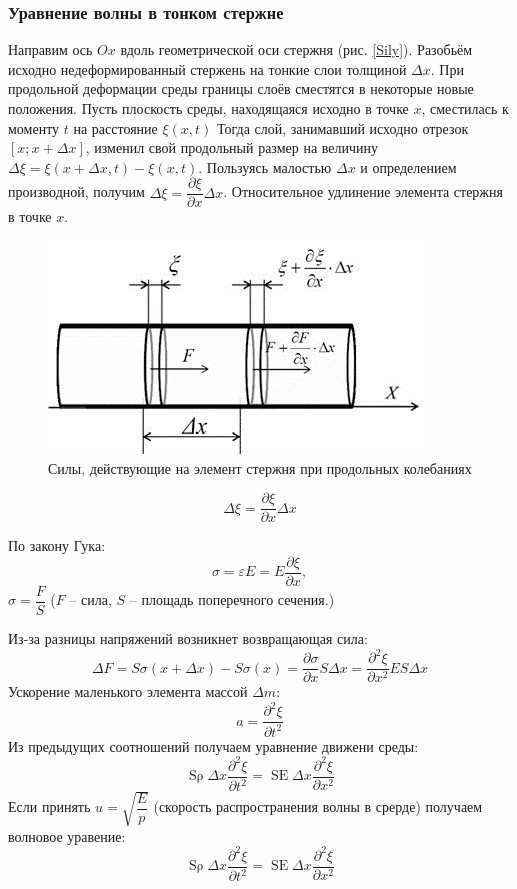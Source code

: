 \documentclass[a4paper,12pt]{article}
\begin{document}
	
	\subsubsection*{Уравнение волны в тонком стержне} 
	
	Направим ось $Ox$ вдоль геометрической оси стержня (рис. \ref{Sily}). Разобьём исходно недеформированный стержень на тонкие слои толщиной $\Delta x$. При продольной деформации среды границы слоёв сместятся в некоторые новые положения. Пусть плоскость среды, находящаяся исходно в точке $x$,
	сместилась к моменту $t$ на расстояние $\xi(x, t)$ Тогда слой, занимавший исходно отрезок $[x ; x+\Delta x]$, изменил свой продольный размер на величину $\Delta \xi=\xi(x+\Delta x, t)-\xi(x, t)$. Пользуясь малостью $\Delta x$ и определением производной, получим $\Delta \xi=\dfrac{\partial \xi}{\partial x} \Delta x$. Относительное удлинение элемента стержня в точке $x$.
	
	\begin{figure}[h!]
		\centering
		\includegraphics[scale=0.7]{1}
		\caption{Силы, действующие на элемент стержня при продольных колебаниях}
		\label{pic1}
	\end{figure}
	
	$$
	\Delta \xi=\frac{\partial \xi}{\partial x} \Delta x
	$$
	
	По закону Гука:
	$$
	\sigma=\varepsilon E=E \frac{\partial \xi}{\partial x},
	$$
	$\sigma = \dfrac{F}{S}$ ($F$ -- сила, $S$ -- площадь поперечного сечения.)
	
	Из-за разницы напряжений возникнет возвращающая сила:
	$$
	\Delta F=S \sigma(x+\Delta x)-S \sigma(x)=\frac{\partial \sigma}{\partial x} S \Delta x=\frac{\partial^{2} \xi}{\partial x^{2}} E S \Delta x
	$$
	Ускорение маленького элемента массой $\Delta m$:
	$$
	a=\frac{\partial^{2} \xi}{\partial t^{2}}
	$$
	Из предыдущих соотношений получаем уравнение движени среды:
	$$
	\operatorname{S\rho} \Delta x \frac{\partial^{2} \xi}{\partial t^{2}}=\operatorname{SE} \Delta x \frac{\partial^{2} \xi}{\partial x^{2}}
	$$
	Если принять $u = \sqrt{\dfrac{E}{p}}$ (скорость распространения волны в срерде) получаем волновое уравение:
	\begin{equation} 
		\label{dif}
		\operatorname{S\rho} \Delta x \frac{\partial^{2} \xi}{\partial t^{2}}=\operatorname{SE} \Delta x \frac{\partial^{2} \xi}{\partial x^{2}}
	\end{equation}
	
\end{document}
